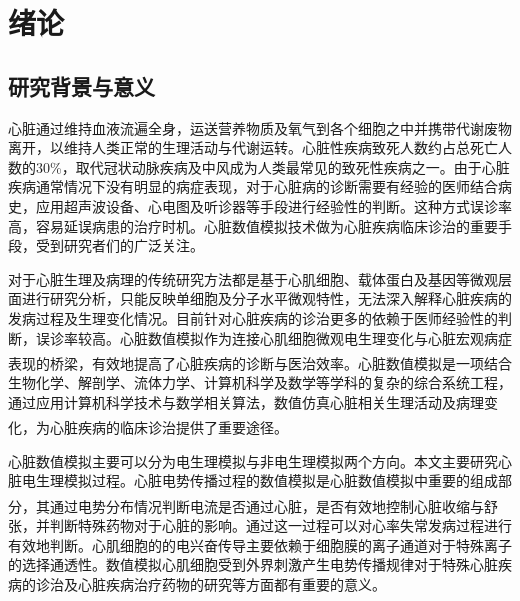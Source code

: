 \documentclass[twoside,UTF8]{nputhesis}
\newcommand{\upcite}[1]{\textsuperscript{\textsuperscript{\cite{#1}}}}
\begin{document}
\tableofcontents 

\mainmatter  

\chapter{绪论}
\section{研究背景与意义}
心脏通过维持血液流遍全身，运送营养物质及氧气到各个细胞之中并携带代谢废物离开，以维持人类正常的生理活动与代谢运转。心脏性疾病致死人数约占总死亡人数的30\%，取代冠状动脉疾病及中风成为人类最常见的致死性疾病之一。由于心脏疾病通常情况下没有明显的病症表现，对于心脏病的诊断需要有经验的医师结合病史，应用超声波设备、心电图及听诊器等手段进行经验性的判断。这种方式误诊率高，容易延误病患的治疗时机。心脏数值模拟技术做为心脏疾病临床诊治的重要手段，受到研究者们的广泛关注。

对于心脏生理及病理的传统研究方法都是基于心肌细胞、载体蛋白及基因等微观层面进行研究分析，只能反映单细胞及分子水平微观特性，无法深入解释心脏疾病的发病过程及生理变化情况。目前针对心脏疾病的诊治更多的依赖于医师经验性的判断，误诊率较高。心脏数值模拟作为连接心肌细胞微观电生理变化与心脏宏观病症表现的桥梁，有效地提高了心脏疾病的诊断与医治效率\upcite{fenton2005modeling,mcculloch1992large,lesh1989cellular}。心脏数值模拟是一项结合生物化学、解剖学、流体力学、计算机科学及数学等学科的复杂的综合系统工程，通过应用计算机科学技术与数学相关算法，数值仿真心脏相关生理活动及病理变化，为心脏疾病的临床诊治提供了重要途径\upcite{shuaiby2013finite,groenendaal2015cell,bernus2002computationally,ten2006comparison,nickerson2010cardiac}。

心脏数值模拟主要可以分为电生理模拟与非电生理模拟两个方向。本文主要研究心脏电生理模拟过程。心脏电势传播过程的数值模拟是心脏数值模拟中重要的组成部分\upcite{Fitzhugh1961Impulses}，其通过电势分布情况判断电流是否通过心脏，是否有效地控制心脏收缩与舒张，并判断特殊药物对于心脏的影响。通过这一过程可以对心率失常发病过程进行有效地判断。心肌细胞的的电兴奋传导主要依赖于细胞膜的离子通道对于特殊离子的选择通透性。数值模拟心肌细胞受到外界刺激产生电势传播规律对于特殊心脏疾病的诊治及心脏疾病治疗药物的研究等方面都有重要的意义。
\end{document}
